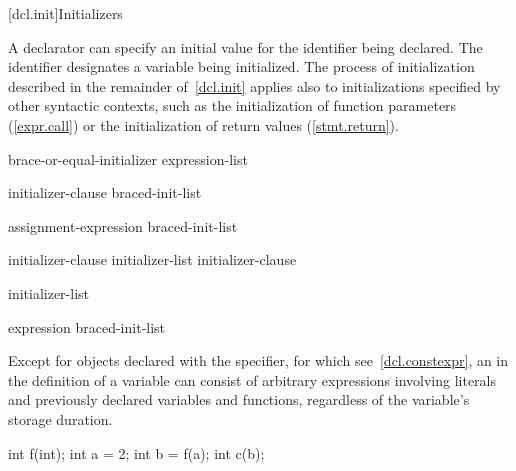 [dcl.init]{Initializers}%

\pnum
A declarator can specify an initial value for the
identifier being declared.
The identifier designates a variable being initialized.
The process of initialization described in the
remainder of~\ref{dcl.init}
applies also to initializations
specified by other syntactic contexts, such as the initialization
of function parameters (\ref{expr.call}) or
the initialization of return values (\ref{stmt.return}).

\begin{bnf}
\br
    brace-or-equal-initializer\br
    \terminal{(} expression-list \terminal{)}
\end{bnf}

\begin{bnf}
\br
    \terminal{=} initializer-clause\br
    braced-init-list
\end{bnf}

\begin{bnf}
\br
    assignment-expression\br
    braced-init-list
\end{bnf}

\begin{bnf}
\br
    initializer-clause \opt\br
    initializer-list \terminal{,} initializer-clause \opt
\end{bnf}

\begin{bnf}
\br
    \terminal{\{} initializer-list \terminal{,\opt} \terminal{\}}\br
    \terminal{\{} \terminal{\}}
\end{bnf}

\begin{bnf}
\br
    expression\br
    braced-init-list
\end{bnf}

\pnum
Except for objects declared with the  specifier, for which see~\ref{dcl.constexpr},
an  in the definition of a variable can consist of
arbitrary
%
%
expressions involving literals and previously declared
variables and functions,
regardless of the variable's storage duration.
\begin{example}

\begin{codeblock}
int f(int);
int a = 2;
int b = f(a);
int c(b);
\end{codeblock}
\end{example}

